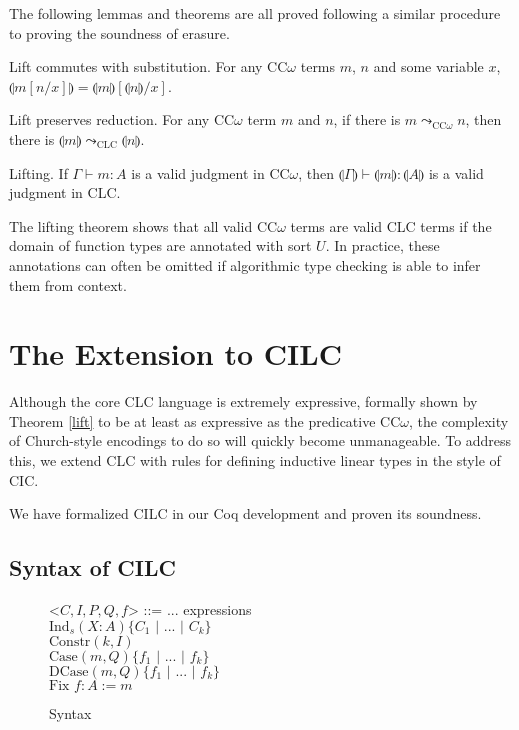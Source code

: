 \documentclass[sigplan,screen,review,anonymous]{acmart}
\newcommand{\indalt}[1][2]{\\\hspace*{-1.2em}\textbar\quad}
\newcommand{\ind}[1]{\text{Ind}_{#1}}
\newcommand{\constr}{\text{Constr}}
\newcommand{\case}{\text{Case}}
\newcommand{\dcase}{\text{DCase}}
\newcommand{\fix}{\text{Fix }}
\newcommand{\sep}{\text{ | }}
\newcommand{\step}{\leadsto}
\newcommand{\lift}[1]{\llparenthesis #1 \rrparenthesis}
\begin{document}
The following lemmas and theorems are all proved following a similar procedure to proving the soundness of erasure.
\begin{lemma}
  Lift commutes with substitution. For any CC$\omega$ terms $m$, $n$ and some variable $x$, $\lift{m[n/x]} = \lift{m}[\lift{n}/x]$.
\end{lemma}

\begin{theorem}
  Lift preserves reduction. For any CC$\omega$ term $m$ and $n$, if there is $m \step_{\scriptscriptstyle \text{CC}\omega} n$, then there is $\lift{m} \step_{\scriptscriptstyle \text{CLC}} \lift{n}$.
\end{theorem}

\begin{theorem} \label{lift}
  Lifting. If $\Gamma \vdash m : A$ is a valid judgment in CC$\omega$, then $\lift{\Gamma} \vdash \lift{m} : \lift{A}$ is a valid judgment in CLC.
\end{theorem}

The lifting theorem shows that all valid CC$\omega$ terms are valid CLC terms if the domain of function types are annotated with sort $U$. In practice, these annotations can often be omitted if algorithmic type checking is able to infer them from context.

\section{The Extension to CILC}
Although the core CLC language is extremely expressive, formally shown by Theorem \ref{lift} to be at least as expressive as the predicative CC$\omega$, the complexity of Church-style encodings to do so will quickly become unmanageable. To address this, we extend CLC with rules for defining inductive linear types in the style of CIC.

We have formalized CILC in our Coq development and proven its soundness.

\subsection{Syntax of CILC}
\begin{figure}[h]
  \caption{Syntax}
  \begin{grammar}
    <$C,I,P,Q,f$> ::= ... \hspace*{10em} expressions
    \indalt $\ind{s}(X : A)\{C_1 \sep ... \sep C_k\}$
    \indalt $\constr(k, I)$
    \indalt $\case(m, Q)\{f_1 \sep ... \sep f_k \}$
    \indalt $\dcase(m, Q)\{f_1 \sep ... \sep f_k \}$
    \indalt $\fix f : A := m$
  \end{grammar}
  \Description{}
  \label{syntax2}
\end{figure}
\end{document}
